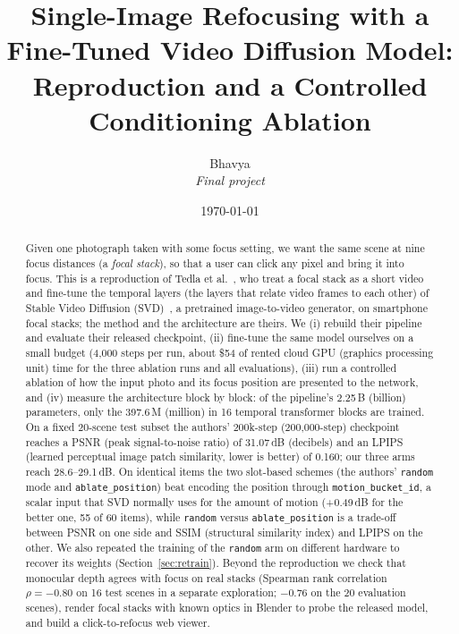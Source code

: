 \documentclass[11pt]{article}
\title{Single-Image Refocusing with a Fine-Tuned Video Diffusion Model:\\
Reproduction and a Controlled Conditioning Ablation}
\author{Bhavya \\ \textit{Final project}}
\date{\today}
\begin{document}
\maketitle

\begin{abstract}
Given one photograph taken with some focus setting, we want the same scene at nine focus distances (a \emph{focal stack}), so that a user can click any pixel and bring it into focus.
This is a reproduction of Tedla et al.~\cite{tedla2025refocus}, who treat a focal stack as a short video and fine-tune the temporal layers (the layers that relate video frames to each other) of Stable Video Diffusion (SVD)~\cite{blattmann2023svd}, a pretrained image-to-video generator, on smartphone focal stacks; the method and the architecture are theirs.
We (i) rebuild their pipeline and evaluate their released checkpoint, (ii) fine-tune the same model ourselves on a small budget (4{,}000 steps per run, about \$54 of rented cloud GPU (graphics processing unit) time for the three ablation runs and all evaluations), (iii) run a controlled ablation of how the input photo and its focus position are presented to the network, and (iv) measure the architecture block by block: of the pipeline's 2.25\,B (billion) parameters, only the 397.6\,M (million) in 16 temporal transformer blocks are trained.
On a fixed 20-scene test subset the authors' 200k-step (200{,}000-step) checkpoint reaches a PSNR (peak signal-to-noise ratio) of 31.07\,dB (decibels) and an LPIPS (learned perceptual image patch similarity, lower is better) of 0.160; our three arms reach 28.6--29.1\,dB.
On identical items the two slot-based schemes (the authors' \texttt{random} mode and \texttt{ablate\_position}) beat encoding the position through \texttt{motion\_bucket\_id}, a scalar input that SVD normally uses for the amount of motion (+0.49\,dB for the better one, 55 of 60 items), while \texttt{random} versus \texttt{ablate\_position} is a trade-off between PSNR on one side and SSIM (structural similarity index) and LPIPS on the other.
We also repeated the training of the \texttt{random} arm on different hardware to recover its weights (Section~\ref{sec:retrain}).
Beyond the reproduction we check that monocular depth agrees with focus on real stacks (Spearman rank correlation $\rho=-0.80$ on 16 test scenes in a separate exploration; $-0.76$ on the 20 evaluation scenes), render focal stacks with known optics in Blender to probe the released model, and build a click-to-refocus web viewer.
\end{abstract}
\end{document}
